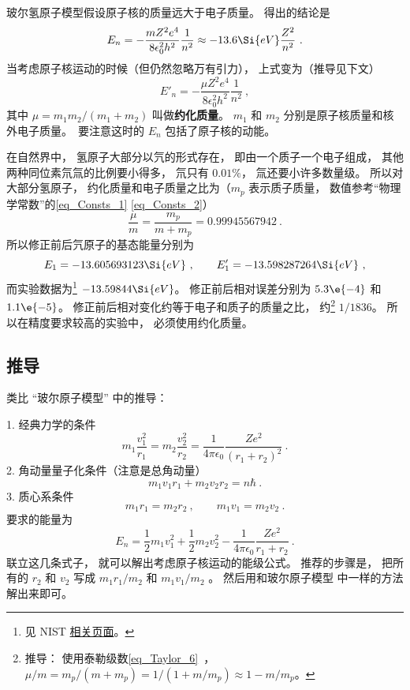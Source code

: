 
玻尔氢原子模型假设原子核的质量远大于电子质量。 得出的结论是
\begin{equation}
E_n = -\frac{mZ^2 e^4}{8\epsilon_0^2 h^2}\frac{1}{n^2} \approx  - 13.6\Si{eV} \frac{Z^2}{n^2}~.
\end{equation}
当考虑原子核运动的时候（但仍然忽略万有引力）， 上式变为（推导见下文）
\begin{equation}\label{eq_HRMass_1}
E'_n = -\frac{\mu Z^2 e^4}{8\epsilon_0^2 h^2} \frac{1}{n^2}~,
\end{equation}
其中 $\mu  = m_1 m_2/(m_1 + m_2)$ 叫做\textbf{约化质量}。 $m_1$ 和 $m_2$ 分别是原子核质量和核外电子质量。　要注意这时的 $E_n$ 包括了原子核的动能。

在自然界中， 氢原子大部分以氕的形式存在， 即由一个质子一个电子组成， 其他两种同位素氘氚的比例要小得多， 氘只有 $0.01\%$， 氚还要小许多数量级。 所以对大部分氢原子， 约化质量和电子质量之比为（$m_p$ 表示质子质量， 数值参考“物理学常数”的\autoref{eq_Consts_1} \autoref{eq_Consts_2}）
\begin{equation}
\frac{\mu}{m} = \frac{m_p}{m + m_p} = 0.99945567942~.
\end{equation}
所以修正前后氕原子的基态能量分别为
\begin{equation}
E_1 = -13.605693123\Si{eV} ~,\qquad 
E'_1 = -13.598287264\Si{eV}~,
\end{equation}
而实验数据为\footnote{见 NIST \href{https://webbook.nist.gov/cgi/cbook.cgi?ID=C12385136&Mask=20}{相关页面}。} $-13.59844\Si{eV}$。 修正前后相对误差分别为 $5.3\e{-4}$ 和 $1.1\e{-5}$。 修正前后相对变化约等于电子和质子的质量之比， 约\footnote{推导： 使用泰勒级数\autoref{eq_Taylor_6}~， $\mu/m = m_p/(m + m_p) = 1/(1 + m/m_p) \approx 1 - m/m_p$。} $1/1836$。 所以在精度要求较高的实验中， 必须使用约化质量。

\subsection{推导}
类比 “玻尔原子模型” 中的推导：

1. 经典力学的条件
\begin{equation}
m_1 \frac{v_1^2}{r_1} = m_2 \frac{v_2^2}{r_2} = \frac{1}{4\pi\epsilon_0} \frac{Z e^2}{(r_1 + r_2)^2}~.
\end{equation}
2. 角动量量子化条件（注意是总角动量）
\begin{equation}
m_1 v_1 r_1 + m_2 v_2 r_2 = n\hbar ~.
\end{equation}
3. 质心系条件
\begin{equation}
m_1 r_1 = m_2 r_2 ~,\qquad m_1 v_1 = m_2 v_2~.
\end{equation}
要求的能量为
\begin{equation}
E_n = \frac12 m_1 v_1^2 + \frac12 m_2 v_2^2 - \frac{1}{4\pi\epsilon_0} \frac{Z e^2}{r_1 + r_2}~.
\end{equation}
联立这几条式子， 就可以解出考虑原子核运动的能级公式。 推荐的步骤是， 把所有的 $r_2$ 和 $v_2$ 写成 $m_1 r_1/m_2$ 和 $m_1 v_1/m_2$ 。 然后用和玻尔原子模型%
中一样的方法解出来即可。
